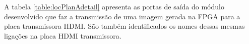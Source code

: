 %
%
A tabela \ref{table:locPlanAdetail} apresenta as portas de saída do módulo desenvolvido que faz a transmissão de uma imagem gerada na FPGA para a placa transmissora HDMI. São também identificados os nomes dessas mesmas ligações na placa HDMI transmissora.

